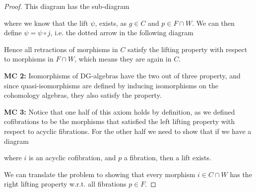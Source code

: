 \begin{proof}
This diagram has the sub-diagram  
\begin{center}
\end{center}
where we know that the lift $\psi$, exists, as $g\in C$ and $p\in F\cap W$. We can then define $\psi = \psi\circ j$, i.e. the dotted arrow in the following diagram
\begin{center}
\end{center}
Hence all retractions of morphisms in $C$ satisfy the lifting property with respect to morphisms in $F\cap W$, which means they are again in $C$. 


\textbf{MC 2:} Isomorphisms of DG-algebras have the two out of three property, and since quasi-isomorphisms are defined by inducing isomorphisms on the cohomology algebras, they also satisfy the property. 
    
\textbf{MC 3:} Notice that one half of this axiom holds by definition, as we defined cofibrations to be the morphisms that satisfied the left lifting property with respect to acyclic fibrations. For the other half we need to show that if we have a diagram 
\begin{center}
\end{center}
where $i$ is an acyclic cofibration, and $p$ a fibration, then a lift exists. 
    
We can translate the problem to showing that every morphism $i\in C\cap W$ has the right lifting property w.r.t. all fibrations $p\in F$. 
    

\end{proof}
